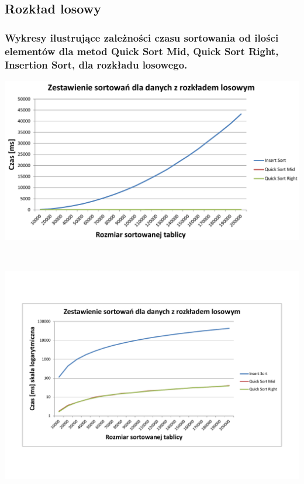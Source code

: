 \documentclass[polish,polish,a4paper]{article}
\begin{document}
\begin{spacing}{1.5}
\subsection{Rozkład losowy}

\subsubsection*{Wykresy ilustrujące zależności czasu sortowania od ilości elementów dla metod Quick Sort Mid, Quick Sort Right, Insertion Sort, dla rozkładu losowego.}




\begin{minipage}[H]{\textwidth}
	\begin{center}
		\includegraphics[scale=0.6]{zad3losowynorm.pdf}
		\label{fig:zad3losn}
	\end{center}
\end{minipage}\\[1cm]



\begin{minipage}[H]{\textwidth}
	\begin{center}
		\includegraphics[scale=0.55]{zad3losowylog.pdf}
		\label{fig:zad3loslog}
	\end{center}
\end{minipage}



\end{spacing}
\end{document}

